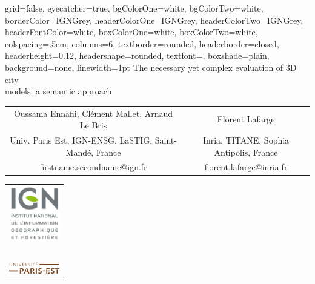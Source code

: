 \documentclass[portrait, a0paper, margin=.5cm]{baposter}
\begin{document}
    \begin{poster}%
    {
        grid=false,
        eyecatcher=true,
        bgColorOne=white,
        bgColorTwo=white,
        borderColor=IGNGrey,
        headerColorOne=IGNGrey,
        headerColorTwo=IGNGrey,
        headerFontColor=white,
        boxColorOne=white,
        boxColorTwo=white,
        colspacing=.5em,
        columns=6,
        textborder=rounded,
        headerborder=closed,
        headerheight=0.12\textheight,
        headershape=rounded,
        textfont={\color{IGNDarkGrey}},
        boxshade=plain,
        background=none,
        linewidth=1pt
    }
    {}
    {
        \color{IGNDarkGrey}
        The necessary yet complex evaluation of 3D city\\models: a semantic approach
    }
    {
        \vspace{.5cm}
        \color{IGNDarkGrey}
        \begin{tabular}{c c}
            \small Oussama Ennafii, Clément Mallet, Arnaud Le Bris & \small Florent Lafarge\\
            \small Univ. Paris Est, IGN-ENSG, LaSTIG, Saint-Mandé, France & \small Inria, TITANE, Sophia Antipolis, France\\
            \small firstname.secondname@ign.fr & \small florent.lafarge@inria.fr
        \end{tabular}
    }
    {
        \begin{tabular}{c}
            \includegraphics[width=2.2cm]{images/logos/ign_logo}\\~\\
            \includegraphics[width=2.2cm]{images/logos/paris_est_logo}
        \end{tabular}
    }



\end{poster}
\end{document}
